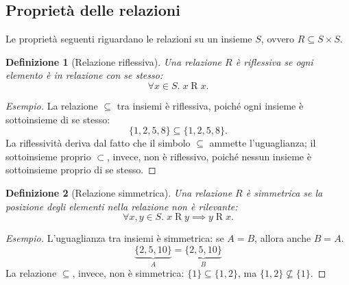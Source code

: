 \documentclass[a4paper, 11pt, oneside]{book}
\theoremstyle{formale}
\newtheorem*{definition}{Definizione}
\newenvironment{esempio}
    {\begin{proof}[\textit{Esempio}]\renewcommand{\qedsymbol}{$\diamond$}}
    {\end{proof}}
\begin{document}
    \subsection{Propriet\`a delle relazioni}
    \label{sec:proprieta-relazioni}
    Le propriet\`a seguenti riguardano le relazioni su un insieme $S$, ovvero
    $R \subseteq S \times S$.

    \begin{definition}[Relazione riflessiva]
        Una relazione $R$ \`e \emph{riflessiva} se ogni elemento \`e in relazione con se
        stesso:
        \begin{equation*}
            \forall x \in S.\; x \mathrel{R} x.
        \end{equation*}
    \end{definition}

    \begin{esempio}
        La relazione $\subseteq$ tra insiemi \`e riflessiva, poich\'e ogni insieme \`e
        sottoinsieme di se stesso:
        \begin{equation*}
            \{1, 2, 5, 8\} \subseteq \{1, 2, 5, 8\}.
        \end{equation*}
        La riflessivit\`a deriva dal fatto che il simbolo $\subseteq$ ammette l'uguaglianza;
        il sottoinsieme proprio $\subset$, invece, non \`e riflessivo, poich\'e nessun insieme
        \`e sottoinsieme proprio di se stesso.
    \end{esempio}

    \begin{definition}[Relazione simmetrica]
        Una relazione $R$ \`e \emph{simmetrica} se la posizione degli elementi nella
        relazione non \`e rilevante:
        \begin{equation*}
            \forall x, y \in S.\; x \mathrel{R} y \implies y \mathrel{R} x.
        \end{equation*}
    \end{definition}

    \begin{esempio}
        L'uguaglianza tra insiemi \`e simmetrica: se $A = B$, allora anche $B = A$.
        \begin{equation*}
            \underbrace{\{2, 5, 10\}}_{A} = \underbrace{\{2, 5, 10\}}_{B}
        \end{equation*}
        La relazione $\subseteq$, invece, non \`e simmetrica: $\{1\} \subseteq \{1, 2\}$, ma
        $\{1, 2\} \not\subseteq \{1\}$.
    \end{esempio}
\end{document}
